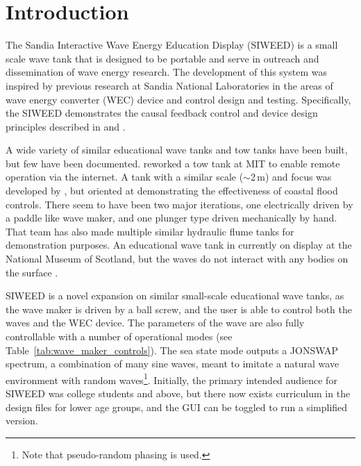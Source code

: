 \documentclass[hardware,article,submit,pdftex,moreauthors]{Definitions/mdpi}
\begin{document}
\section{Introduction}
The Sandia Interactive Wave Energy Education Display (SIWEED) is a small scale wave tank that is designed to be portable and serve in outreach and dissemination of wave energy research.
The development of this system was inspired by previous research at Sandia National Laboratories in the areas of wave energy converter (WEC) device and control design and testing.
Specifically, the SIWEED demonstrates the causal feedback control and device design principles described in \citet{Bacelli2020} and \citet{Coe2020a}.


A wide variety of similar educational wave tanks and tow tanks have been built, but few have been documented.
\citet{unger2006creating} reworked a tow tank at MIT to enable remote operation via the internet.
A tank with a similar scale ($\sim$2\,m) and focus was developed by \cite{Trust2015}, but oriented at demonstrating the effectiveness of coastal flood controls.
There seem to have been two major iterations, one electrically driven by a paddle like wave maker, and one plunger type driven mechanically by hand. 
That team has also made multiple similar hydraulic flume tanks for demonstration purposes.
An educational wave tank in currently on display at the National Museum of Scotland, but the waves do not interact with any bodies on the surface \cite{Ivan2016}. 

SIWEED is a novel expansion on similar small-scale educational wave tanks, as the wave maker is driven by a ball screw, and the user is able to control both the waves and the WEC device.
The parameters of the wave are also fully controllable with a number of operational modes (see Table~\ref{tab:wave_maker_controls}).
The sea state mode outputs a JONSWAP spectrum, a combination of many sine waves, meant to imitate a natural wave environment with random waves\footnote{Note that pseudo-random phasing is used.}.
Initially, the primary intended audience for SIWEED was college students and above, but there now exists curriculum in the design files for lower age groups, and the GUI can be toggled to run a simplified version.
\end{document}
